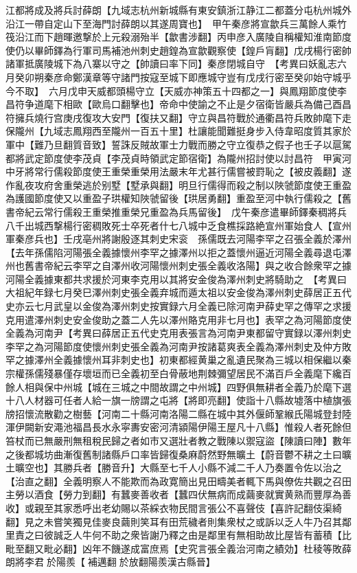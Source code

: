 江都將成及將兵討薛朗【九域志杭州新城縣有東安鎮浙江静江二都蓋分屯杭州城外沿江一帶自定山下至海門討薛朗以其遂周寶也】　甲午秦彦將宣歙兵三萬餘人乘竹筏沿江而下趙暉邀撃於上元殺溺殆半【歙書涉翻】丙申彦入廣陵自稱權知淮南節度使仍以畢師鐸為行軍司馬補池州刺史趙鍠為宣歙觀察使【鍠戶肓翻】戊戌楊行密帥諸軍抵廣陵城下為八寨以守之【帥讀曰率下同】秦彦閉城自守　【考異曰妖亂志六月癸卯朔秦彦命鄭漢章等守諸門按寇至城下即應城守豈有戊戌行密至癸卯始守城乎今不取】　六月戊申天威都頭楊守立【天威亦神策五十四都之一】與鳳翔節度使李昌符争道麾下相歐【歐烏口翻擊也】帝命中使諭之不止是夕宿衛皆嚴兵為備己酉昌符擁兵燒行宫庚戌復攻大安門【復扶又翻】守立與昌符戰於通衢昌符兵敗帥麾下走保隴州【九域志鳳翔西至隴州一百五十里】杜讓能聞難挺身步入侍韋昭度質其家於軍中【難乃旦翻質音致】誓誅反賊故軍士力戰而勝之守立復恭之假子也壬子以扈駕都將武定節度使李茂貞【李茂貞時領武定節宿衛】為隴州招討使以討昌符　甲寅河中牙將常行儒殺節度使王重榮重榮用法嚴末年尤甚行儒嘗被罸恥之【被皮義翻】遂作亂夜攻府舍重榮逃於别墅【墅承與翻】明旦行儒得而殺之制以陜虢節度使王重盈為護國節度使又以重盈子珙權知陜虢留後【珙居勇翻】重盈至河中執行儒殺之【舊書帝紀云常行儒殺王重榮推重榮兄重盈為兵馬留後】　戊午秦彦遣畢師鐸秦稠將兵八千出城西撃楊行密稠敗死士卒死者什七八城中乏食樵採路絶宣州軍始食人【宣州軍秦彦兵也】壬戌亳州將謝殷逐其刺史宋衮　孫儒既去河陽李罕之召張全義於澤州【去年孫儒陷河陽張全義據懷州李罕之據澤州以拒之蓋懷州逼近河陽全義尋退屯澤州也舊書帝紀云李罕之自澤州收河陽懷州刺史張全義收洛陽】與之收合餘衆罕之據河陽全義據東都共求援於河東李克用以其將安金俊為澤州刺史將騎助之　【考異曰大祖紀年録七月癸巳澤州刺史張全義弃城而遁太祖以安金俊為澤州刺史薛居正五代史亦云七月武皇以金俊為澤州刺史按實録六月全義已除河南尹薛史罕之傳罕之求援克用遣澤州刺史安金俊助之蓋二人先以澤州賂克用非七月也】表罕之為河陽節度使全義為河南尹【考異曰薛居正五代史克用表張言為河南尹東都留守實録以澤州刺史李罕之為河陽節度使懷州刺史張全義為河南尹按諸葛爽表全義為澤州刺史及仲方敗罕之據澤州全義據懷州耳非刺史也】初東都經黄巢之亂遺民聚為三城以相保繼以秦宗權孫儒殘暴僅存壞垣而已全義初至白骨蔽地荆棘彌望居民不滿百戶全義麾下纔百餘人相與保中州城【城在三城之中間故謂之中州城】四野俱無耕者全義乃於麾下選十八人材器可任者人給一旗一牓謂之屯將【將即亮翻】使詣十八縣故墟落中植旗張牓招懷流散勸之樹藝【河南二十縣河南洛陽二縣在城中其外偃師鞏緱氏陽城登封陸渾伊闕新安澠池福昌長水永寜夀安密河清潁陽伊陽王屋凡十八縣】惟殺人者死餘但笞杖而已無嚴刑無租稅民歸之者如市又選壯者教之戰陳以禦寇盜【陳讀曰陣】數年之後都城坊曲漸復舊制諸縣戶口率皆歸復桑麻蔚然野無曠土【蔚音鬱不耕之土曰曠土曠空也】其勝兵者【勝音升】大縣至七千人小縣不減二千人乃奏置令佐以治之【治直之翻】全義明察人不能欺而為政寛簡出見田疇美者輒下馬與僚佐共觀之召田主勞以酒食【勞力到翻】有蠶麥善收者【蠶四伏無病而成繭麥就實黄熟而豐厚為善收】或親至其家悉呼出老幼賜以茶綵衣物民間言張公不喜聲伎【喜許記翻伎渠綺翻】見之未嘗笑獨見佳麥良繭則笑耳有田荒穢者則集衆杖之或訴以乏人牛乃召其鄰里責之曰彼誠乏人牛何不助之衆皆謝乃釋之由是鄰里有無相助故比屋皆有蓄積【比毗至翻又毗必翻】凶年不饑遂成富庶焉【史究言張全義治河南之績効】杜稜等敗薛朗將李君於陽羨【補邁翻於放翻陽羨漢古縣晉】

